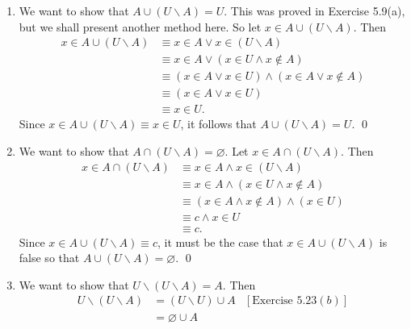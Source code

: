 \begin{enumerate}
      \begin{enumerate}
         \item We want to show that $A \cup (U{\backslash}A) = U$. This was
               proved in Exercise 5.9(a), but we shall present another method 
               here. So let
               $x \in A \cup (U{\backslash}A)$. Then
               \begin{align*}
                  x \in A \cup (U{\backslash}A)
                     &\equiv x \in A \lor x \in (U{\backslash}A) \\
                     &\equiv x \in A \lor (x \in U \land x \notin A) \\
                     &\equiv (x \in A \lor x \in U) \land
                             (x \in A \lor x \notin A) \\
                     &\equiv (x \in A \lor x \in U) \\
                     &\equiv x \in U.
               \end{align*}
               Since $x \in A \cup (U{\backslash}A) \equiv x \in U$, it follows
                     that $A \cup (U{\backslash}A) = U$. \qed
         \item We want to show that $A \cap (U{\backslash}A) = \varnothing$. Let
               $x \in A \cap (U{\backslash}A)$. Then
               \begin{align*}
                  x \in A \cap (U{\backslash}A)
                     &\equiv x \in A \land x \in (U{\backslash}A) \\
                     &\equiv x \in A \land (x \in U \land x \notin A) \\
                     &\equiv (x \in A \land x \notin A) \land (x \in U) \\
                     &\equiv c \land x \in U \\
                     &\equiv c.
               \end{align*}
               Since $x \in A \cup (U{\backslash}A) \equiv c$, it must be the
               case that $x \in A \cup (U{\backslash}A)$ is false so that
               $A \cup (U{\backslash}A) = \varnothing$. \qed
         \item We want to show that $U{\backslash}(U{\backslash}A) = A$. Then
               \begin{align*}
                  U{\backslash}(U{\backslash}A)
                     &= (U{\backslash}U) \cup A &[\text{Exercise } 5.23(b)] \\
                     &= \varnothing \cup A \\

\end{align*}
\end{enumerate}
\end{enumerate}
